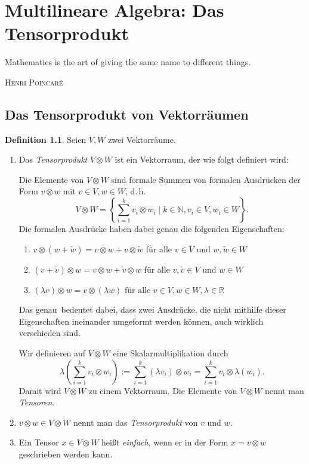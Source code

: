 \documentclass[a4paper]{scrbook}
\numberwithin{equation}{chapter}
\newcommand{\R}{\mathbb{R}}
\theoremstyle{definition}
\newtheorem{defn}{Definition}[section]
\begin{document}
\chapter{Multilineare Algebra: Das Tensorprodukt}
\epigraph{Mathematics is the art of giving the same name to different things.}
{\textsc{Henri Poincaré}}

\section{Das Tensorprodukt von Vektorräumen}
\begin{defn} \label{defn:tensor_prod}
	Seien $V,W$ zwei Vektorräume.
	\begin{enumerate}[label=(\alph*)]
		\item Das \emph{Tensorprodukt} $V\otimes W$ ist ein Vektorraum, der wie folgt definiert wird:

			Die Elemente von $V\otimes W$ sind formale Summen von formalen Ausdrücken der Form $v\otimes w$ mit $v\in V, w\in W$, d.\,h.
			\[V\otimes W = \left\{\sum_{i=1}^k v_i \otimes w_i \mid k\in\mathbb N, v_i \in V, w_i \in W\right\}.\]
			Die formalen Ausdrücke haben dabei genau die folgenden Eigenschaften:
			\begin{enumerate}[label=(\roman*)]
				\item $v \otimes (w + \tilde w) = v\otimes w + v \otimes \tilde w$ für alle $v \in V$ und $w, \tilde w \in W$
				\item $(v + \tilde v) \otimes w = v\otimes w + \tilde v \otimes w$ für alle $v, \tilde v \in V$ und $w \in W$
				\item $(\lambda v) \otimes w = v \otimes (\lambda w)$ für alle $v\in V, w\in W, \lambda \in \R$
			\end{enumerate}
			Das \glqq genau\grqq\ bedeutet dabei, dass zwei Ausdrücke, die nicht mithilfe dieser Eigenschaften ineinander umgeformt werden können, auch wirklich verschieden sind.

			Wir definieren auf $V\otimes W$ eine Skalarmultiplikation durch
			\[\lambda\left(\sum_{i=1}^k v_i \otimes w_i\right) := \sum_{i=1}^k (\lambda v_i) \otimes w_i = \sum_{i=1}^k v_i \otimes \lambda(w_i).\]
			Damit wird $V\otimes W$ zu einem Vektorraum. Die Elemente von $V \otimes W$ nennt man \emph{Tensoren}.
		\item $v\otimes w \in V \otimes W$ nennt man das \emph{Tensorprodukt} von $v$ und $w$.
		\item Ein Tensor $x \in V \otimes W$ heißt \emph{einfach}, wenn er in der Form $x = v\otimes w$ geschrieben werden kann.
	\end{enumerate}
\end{defn}
\end{document}
